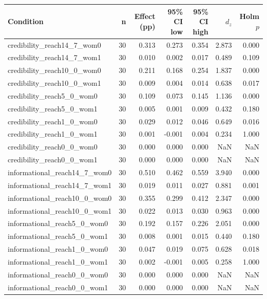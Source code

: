 \begin{tabular}{lrrrrrr}
\toprule
Condition & n & Effect (pp) & 95\% CI low & 95\% CI high & $d_z$ & Holm $p$ \\
\midrule
credibility_reach14_7_wom0 & 30 & 0.313 & 0.273 & 0.354 & 2.873 & 0.000 \\
credibility_reach14_7_wom1 & 30 & 0.010 & 0.002 & 0.017 & 0.489 & 0.109 \\
credibility_reach10_0_wom0 & 30 & 0.211 & 0.168 & 0.254 & 1.837 & 0.000 \\
credibility_reach10_0_wom1 & 30 & 0.009 & 0.004 & 0.014 & 0.638 & 0.017 \\
credibility_reach5_0_wom0 & 30 & 0.109 & 0.073 & 0.145 & 1.136 & 0.000 \\
credibility_reach5_0_wom1 & 30 & 0.005 & 0.001 & 0.009 & 0.432 & 0.180 \\
credibility_reach1_0_wom0 & 30 & 0.029 & 0.012 & 0.046 & 0.649 & 0.016 \\
credibility_reach1_0_wom1 & 30 & 0.001 & -0.001 & 0.004 & 0.234 & 1.000 \\
credibility_reach0_0_wom0 & 30 & 0.000 & 0.000 & 0.000 & NaN & NaN \\
credibility_reach0_0_wom1 & 30 & 0.000 & 0.000 & 0.000 & NaN & NaN \\
informational_reach14_7_wom0 & 30 & 0.510 & 0.462 & 0.559 & 3.940 & 0.000 \\
informational_reach14_7_wom1 & 30 & 0.019 & 0.011 & 0.027 & 0.881 & 0.001 \\
informational_reach10_0_wom0 & 30 & 0.355 & 0.299 & 0.412 & 2.347 & 0.000 \\
informational_reach10_0_wom1 & 30 & 0.022 & 0.013 & 0.030 & 0.963 & 0.000 \\
informational_reach5_0_wom0 & 30 & 0.192 & 0.157 & 0.226 & 2.051 & 0.000 \\
informational_reach5_0_wom1 & 30 & 0.008 & 0.001 & 0.015 & 0.440 & 0.180 \\
informational_reach1_0_wom0 & 30 & 0.047 & 0.019 & 0.075 & 0.628 & 0.018 \\
informational_reach1_0_wom1 & 30 & 0.002 & -0.001 & 0.005 & 0.258 & 1.000 \\
informational_reach0_0_wom0 & 30 & 0.000 & 0.000 & 0.000 & NaN & NaN \\
informational_reach0_0_wom1 & 30 & 0.000 & 0.000 & 0.000 & NaN & NaN \\
\bottomrule
\end{tabular}
